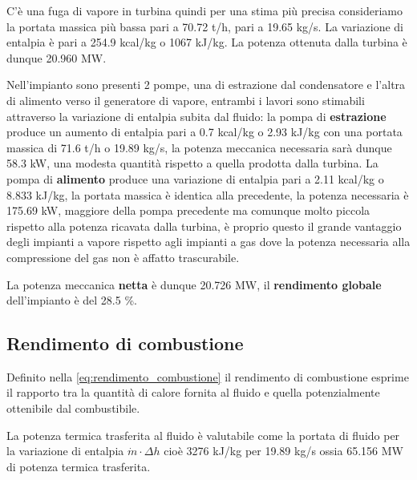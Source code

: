 \documentclass[a4paper,12pt]{article}
\begin{document}
C'è una fuga di vapore in turbina quindi per una stima più precisa consideriamo la portata massica più bassa pari
a 70.72 t/h, pari a 19.65 kg/s. La variazione di entalpia è pari a 254.9 kcal/kg o 1067 kJ/kg.
La potenza ottenuta dalla turbina è dunque 20.960 MW.

Nell'impianto sono presenti 2 pompe, una di estrazione dal condensatore e l'altra di alimento verso il generatore
di vapore, entrambi i lavori sono stimabili attraverso la variazione di entalpia subita dal fluido:
la pompa di \textbf{estrazione} produce un aumento di entalpia pari a 0.7 kcal/kg o 2.93 kJ/kg con una portata massica di
71.6 t/h o 19.89 kg/s, la potenza meccanica necessaria sarà dunque 58.3 kW, una modesta quantità rispetto a quella prodotta dalla turbina.
La pompa di \textbf{alimento} produce una variazione di entalpia pari a 2.11 kcal/kg o 8.833 kJ/kg, la portata massica è identica
alla precedente, la potenza necessaria è 175.69 kW, maggiore della pompa precedente ma comunque molto piccola rispetto alla potenza
ricavata dalla turbina, è proprio questo il grande vantaggio degli impianti a vapore rispetto agli impianti a gas dove la potenza
necessaria alla compressione del gas non è affatto trascurabile.

La potenza meccanica \textbf{netta} è dunque 20.726 MW, il \textbf{rendimento globale} dell'impianto è del 28.5 \%.

\subsection{Rendimento di combustione}
\label{subsec:rendimento_combustione}
Definito nella \eqref{eq:rendimento_combustione} il rendimento di combustione esprime il rapporto tra la quantità di calore
fornita al fluido e quella potenzialmente ottenibile dal combustibile.

La potenza termica trasferita al fluido è valutabile come la portata di fluido per la variazione di entalpia $\dot m\cdot \Delta h$
cioè 3276 kJ/kg per 19.89 kg/s ossia 65.156 MW di potenza termica trasferita.
\end{document}
